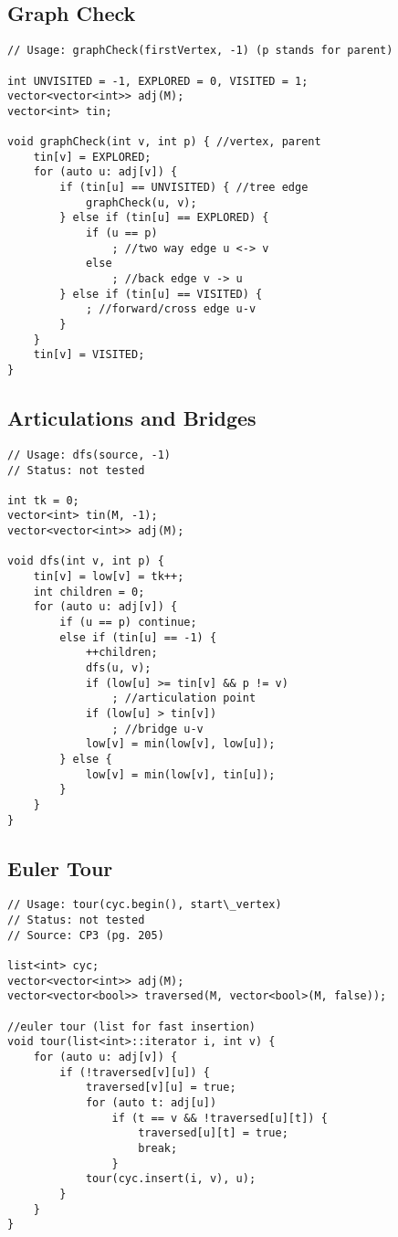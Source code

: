 \documentclass[12pt, a4paper, twoside]{article}
\begin{document}
\subsection{Graph Check}
\begin{lstlisting}
// Usage: graphCheck(firstVertex, -1) (p stands for parent)

int UNVISITED = -1, EXPLORED = 0, VISITED = 1;
vector<vector<int>> adj(M);
vector<int> tin;

void graphCheck(int v, int p) { //vertex, parent
	tin[v] = EXPLORED;
	for (auto u: adj[v]) {
		if (tin[u] == UNVISITED) { //tree edge
			graphCheck(u, v);
		} else if (tin[u] == EXPLORED) {
			if (u == p)
				; //two way edge u <-> v
			else
				; //back edge v -> u
		} else if (tin[u] == VISITED) {
			; //forward/cross edge u-v
		}
	}
	tin[v] = VISITED;
}
\end{lstlisting}

\subsection{Articulations and Bridges}
\begin{lstlisting}
// Usage: dfs(source, -1)
// Status: not tested

int tk = 0;
vector<int> tin(M, -1);
vector<vector<int>> adj(M);

void dfs(int v, int p) {
	tin[v] = low[v] = tk++;
	int children = 0;
	for (auto u: adj[v]) {
		if (u == p) continue;
		else if	(tin[u] == -1) {
			++children;
			dfs(u, v);
			if (low[u] >= tin[v] && p != v)
				; //articulation point
			if (low[u] > tin[v])
				; //bridge u-v
			low[v] = min(low[v], low[u]);
		} else {
			low[v] = min(low[v], tin[u]);
		}
	}
}
\end{lstlisting}

\subsection{Euler Tour}
\begin{lstlisting}
// Usage: tour(cyc.begin(), start\_vertex)
// Status: not tested
// Source: CP3 (pg. 205)

list<int> cyc;
vector<vector<int>> adj(M);
vector<vector<bool>> traversed(M, vector<bool>(M, false));

//euler tour (list for fast insertion)
void tour(list<int>::iterator i, int v) {
	for (auto u: adj[v]) {
		if (!traversed[v][u]) {
			traversed[v][u] = true;
			for (auto t: adj[u])
				if (t == v && !traversed[u][t]) {
					traversed[u][t] = true;
					break;
				}
			tour(cyc.insert(i, v), u);
		}
	}
}
\end{lstlisting}
\end{document}
